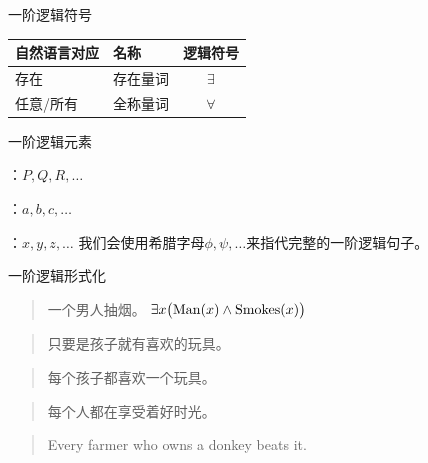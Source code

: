 \documentclass{zhslides}
\begin{document}
\begin{frame}{一阶逻辑符号}
  
  \begin{table}[h]
  \centering
  {\renewcommand{\arraystretch}{1.2}
  \begin{tabular}{llc}
    \textbf{自然语言对应} & \textbf{名称} & \textbf{逻辑符号} \\\hline
    存在 & 存在量词 & $\exists$ \\\pause
    任意/所有 & 全称量词 & $\forall$ \\
  \end{tabular}
  }
  \end{table}
  
\end{frame}


\begin{frame}{一阶逻辑元素}
  
  \bit
    \item {}：$P, Q, R, \dots$
    \item {}：$a, b, c, \dots$
    \item {}：$x, y, z, \dots$
  \eit
  \pause
  我们会使用希腊字母$\phi, \psi, \dots$来指代完整的一阶逻辑句子。
  
\end{frame}


\begin{frame}{一阶逻辑形式化}

  \begin{quote}
    一个男人抽烟。
    \pause\hfill
    $\exists x \left( \pred{Man}(x) \land \pred{Smokes}(x) \right)$
  \end{quote}
  
  \vspace{1em}\pause
  \begin{quote}
    只要是孩子就有喜欢的玩具。
  \end{quote}
  
  \vspace{1em}\pause
  \begin{quote}
    每个孩子都喜欢一个玩具。
  \end{quote}

  \vspace{1em}\pause
  \begin{quote}
    每个人都在享受着好时光。
  \end{quote}

  \vspace{1em}\pause
  \begin{quote}
    Every farmer who owns a donkey beats it.
  \end{quote}

\end{frame}
\end{document}
